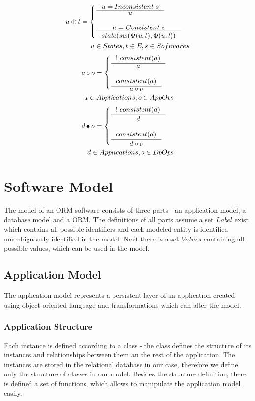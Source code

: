 \documentclass[11pt]{article}
\begin{document}
\begin{align*}
 u \oplus t = \begin{cases}
 	\inference{u = Inconsistent \; s}{u} \\ \\
 	\inference{u = Consistent \; s}{state(sw(\Psi(u, t), \Phi(u,t))} 
\end{cases}\\ 
u \in States, t \in E, s \in Softwares
\end{align*}
\begin{align*}
 a \circ o = \begin{cases}
 	\inference{!\;consistent(a)}{a} \\ \\
 	\inference{consistent(a)}{a \circ o} 
\end{cases}\\ 
a \in Applications, o \in AppOps
\end{align*}
\begin{align*}
 d \bullet o = \begin{cases}
 	\inference{!\;consistent(d)}{d} \\ \\
 	\inference{consistent(d)}{d \circ o} 
\end{cases}\\ 
d \in Applications, o \in DbOps
\end{align*}

\section{Software Model}
The model of an ORM software consists of three parts - an application model, a database model and a ORM. The definitions of all parts assume a set $Label$ exist which contains all possible identifiers and each modeled entity is identified unambiguously identified in the model. Next there is a set $Values$ containing all possible values, which can be used in the model. 

\subsection{Application Model}
\label{sec:appModel}
The application model represents a persistent layer of an application created using object oriented language and transformations which can alter the model. 
\subsubsection{Application Structure}
Each instance is defined according to a class - the class defines the structure of its instances and relationships between them an the rest of the application. The instances are stored in the relational database in our case, therefore we define only the structure of classes in our model. Besides the structure definition, there is defined a set of functions, which allows to manipulate the application model easily. 
\end{document}
